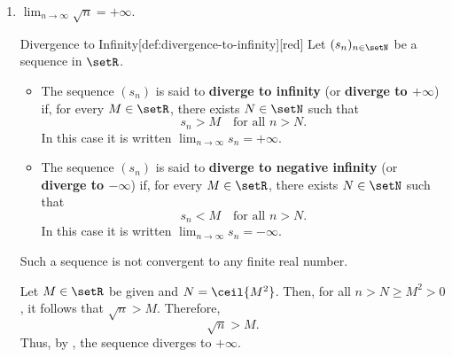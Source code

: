 \begin{enumerate}
\begin{enumerate}
    \item \(\lim_{n\to\infty}\sqrt{n}=+\infty\).
    \begin{define}{Divergence to Infinity}[def:divergence-to-infinity][red]
      Let \((s_n)_{n\in\setN}\) be a sequence in \(\setR\).
      \begin{itemize}
        \item The sequence \((s_n)\) is said to \textbf{diverge to infinity} (or \textbf{diverge to \(+\infty\)}) if,
          for every \(M\in\setR\), there exists \(N\in\setN\) such that
          \[
          s_n > M \quad\text{for all } n > N.
          \]
          In this case it is written \(\lim_{n\to\infty} s_n = +\infty\).
        \item The sequence \((s_n)\) is said to \textbf{diverge to negative infinity} (or \textbf{diverge to \(-\infty\)}) if,
          for every \(M\in\setR\), there exists \(N\in\setN\) such that
          \[
          s_n < M \quad\text{for all } n > N.
          \]
          In this case it is written \(\lim_{n\to\infty} s_n = -\infty\).
      \end{itemize}
      Such a sequence is not convergent to any finite real number.
    \end{define}

    \begin{subprove}
      Let \(M \in \setR\) be given and \(N=\ceil{M^{2}}\).
      Then, for all \(n > N \ge M^2 > 0\), it follows that \(\sqrt{n} > M\).
      Therefore,
      \[
        \sqrt{n} > M.
      \]
      Thus, by , the sequence diverges to \(+\infty\).
    \end{subprove}

  \end{enumerate}

  \newpage


\end{enumerate}
